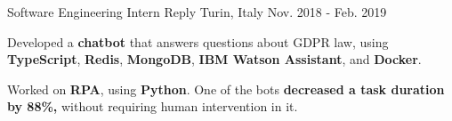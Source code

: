 \begin{cventries}
  \cventry
  {Software Engineering Intern} %
  {Reply} %
  {Turin, Italy} %
  {Nov. 2018 - Feb. 2019} %
  {
    \begin{cvitems} %
      \item Developed a \textbf{chatbot} that answers questions about GDPR law, using \textbf{TypeScript}, \textbf{Redis}, \textbf{MongoDB}, \textbf{IBM Watson Assistant}, and \textbf{Docker}.
      \item Worked on \textbf{RPA}, using \textbf{Python}. One of the bots \textbf{decreased a task duration by 88\%,} without requiring human intervention in it.
    \end{cvitems}
  }

\end{cventries}
